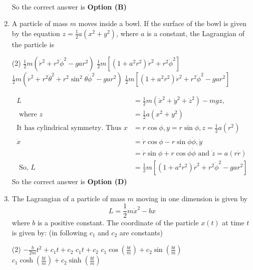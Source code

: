 \begin{enumerate}
\begin{answer}
\begin{align*}
\end{align*}
So the correct answer is \textbf{Option (B)}
\end{answer}
\item A particle of mass $m$ moves inside a bowl. If the surface of the bowl is given by the equation $z=\frac{1}{2} a\left(x^{2}+y^{2}\right)$, where $a$ is a constant, the Lagrangian of the particle is
{}
\begin{tasks}(2)
\task[\textbf{A.}] $\frac{1}{2} m\left(\dot{r}^{2}+r^{2} \dot{\phi}^{2}-g a r^{2}\right)$
\task[\textbf{B.}] $\frac{1}{2} m\left[\left(1+a^{2} r^{2}\right) \dot{r}^{2}+r^{2} \dot{\phi}^{2}\right]$
\task[\textbf{C.}]  $\frac{1}{2} m\left(\dot{r}^{2}+r^{2} \dot{\theta}^{2}+r^{2} \sin ^{2} \theta \dot{\phi}^{2}-g a r^{2}\right)$
\task[\textbf{D.}]  $\frac{1}{2} m\left[\left(1+a^{2} r^{2}\right) \dot{r}^{2}+r^{2} \dot{\phi}^{2}-g a r^{2}\right]$
\end{tasks}
\begin{answer}
\begin{align*}
L&=\frac{1}{2} m\left(\dot{x}^{2}+\dot{y}^{2}+\dot{z}^{2}\right)-m g z,\\\text{ where } z&=\frac{1}{2} a\left(x^{2}+y^{2}\right)\\
\text{It has cylindrical symmetry. Thus }x&=r \cos \phi, y=r \sin \phi, z=\frac{1}{2} a\left(r^{2}\right)\\
\dot{x}&=\dot{r} \cos \phi-r \sin \phi \dot{\phi}, \dot{y}\\&=\dot{r} \sin \phi+r \cos \phi \dot{\phi}\text{ and }\dot{z}=a(r \dot{r})\\
\text{	So, }L&=\frac{1}{2} m\left[\left(1+a^{2} r^{2}\right) \dot{r}^{2}+r^{2} \dot{\phi}^{2}-g a r^{2}\right]
\end{align*}
So the correct answer is \textbf{Option (D)}
\end{answer}
\item The Lagrangian of a particle of mass $m$ moving in one dimension is given by
$$
L=\frac{1}{2} m \dot{x}^{2}-b x
$$
where $b$ is a positive constant. The coordinate of the particle $x(t)$ at time $t$ is given by: (in following $c_{1}$ and $c_{2}$ are constants)
{}
\begin{tasks}(2)
\task[\textbf{A.}] $-\frac{b}{2 m} t^{2}+c_{1} t+c_{2}$
\task[\textbf{B.}] $c_{1} t+c_{2}$
\task[\textbf{C.}] $c_{1} \cos \left(\frac{b t}{m}\right)+c_{2} \sin \left(\frac{b t}{m}\right)$
\task[\textbf{D.}] $c_{1} \cosh \left(\frac{b t}{m}\right)+c_{2} \sinh \left(\frac{b t}{m}\right)$

\end{tasks}
\end{enumerate}
